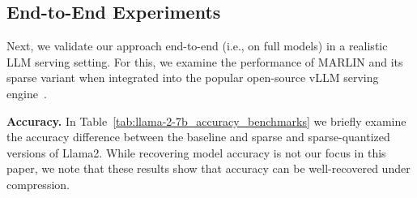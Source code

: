 \documentclass{article}
\theoremstyle{plain}
\theoremstyle{definition}
\theoremstyle{remark}
\renewcommand{\paragraph}[1]{\vspace{0.1em}\noindent\textbf{#1}}
\begin{document}
    


\subsection{End-to-End Experiments}

Next, we validate our approach end-to-end (i.e., on full models) in a realistic LLM serving setting. For this, we examine the performance of MARLIN and its sparse variant when integrated into the popular open-source vLLM serving engine~\cite{vllm}. 


\paragraph{Accuracy.} In Table~\ref{tab:llama-2-7b_accuracy_benchmarks} we briefly examine the accuracy difference between the baseline and sparse and sparse-quantized versions of Llama2. While recovering model accuracy is not our focus in this paper, we note that these results show that accuracy can be well-recovered under compression. 
\end{document}
